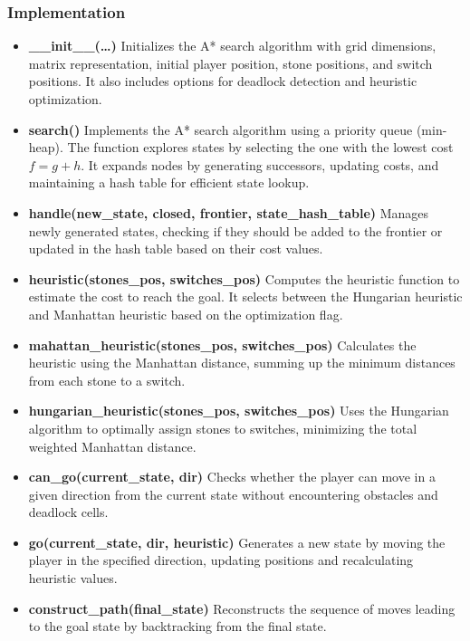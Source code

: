 \subsubsection{Implementation}
\begin{itemize}
	\item \textbf{\_\_init\_\_(\ldots)}
	      Initializes the A* search algorithm with grid dimensions, matrix representation, initial player position, stone positions, and switch positions. It also includes options for deadlock detection and heuristic optimization.

	\item \textbf{search()}
	      Implements the A* search algorithm using a priority queue (min-heap). The function explores states by selecting the one with the lowest cost \(f = g + h\). It expands nodes by generating successors, updating costs, and maintaining a hash table for efficient state lookup.

	\item \textbf{handle(new\_state, closed, frontier, state\_hash\_table)}
	      Manages newly generated states, checking if they should be added to the frontier or updated in the hash table based on their cost values.

	\item \textbf{heuristic(stones\_pos, switches\_pos)}
	      Computes the heuristic function to estimate the cost to reach the goal. It selects between the Hungarian heuristic and Manhattan heuristic based on the optimization flag.

	\item \textbf{mahattan\_heuristic(stones\_pos, switches\_pos)}
	      Calculates the heuristic using the Manhattan distance, summing up the minimum distances from each stone to a switch.

	\item \textbf{hungarian\_heuristic(stones\_pos, switches\_pos)}
	      Uses the Hungarian algorithm to optimally assign stones to switches, minimizing the total weighted Manhattan distance.

	\item \textbf{can\_go(current\_state, dir)}
	      Checks whether the player can move in a given direction from the current state without encountering obstacles and deadlock cells.

	\item \textbf{go(current\_state, dir, heuristic)}
	      Generates a new state by moving the player in the specified direction, updating positions and recalculating heuristic values.

	\item \textbf{construct\_path(final\_state)}
	      Reconstructs the sequence of moves leading to the goal state by backtracking from the final state.

\end{itemize}

